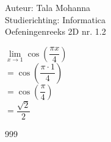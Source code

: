 \documentclass[a4paper]{article}
\begin{document}
\noindent \large Auteur: Tala Mohanna \\
\noindent \large Studierichting: Informatica\\
\noindent \large Oefeningenreeks 2D nr. 1.2\\

\medskip

\normalsize

$ \lim\limits_{x \rightarrow 1} \cos\left(\dfrac{\pi x}{4}\right) $ \\

$ = \cos\left(\dfrac{\pi \cdot 1}{4}\right) $ \\

$ = \cos\left(\dfrac{\pi}{4}\right) $ \\

$ = \dfrac{\sqrt{2}}{2} $


\begin{thebibliography}{999}
\end{thebibliography}
\end{document}
